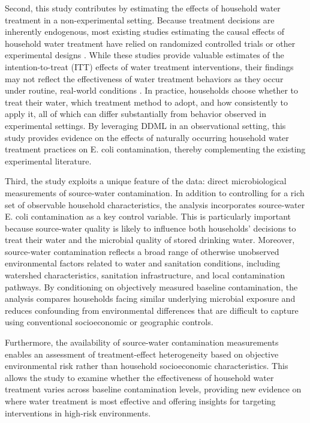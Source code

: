 \documentclass [11pt]{article}
\theoremstyle{plain}
\theoremstyle{definition}
\theoremstyle{remark}
\newcommand{\1}{\bm{1}}
\begin{document}
Second, this study contributes by estimating the effects of household water treatment in a non-experimental setting. Because treatment decisions are inherently endogenous, most existing studies estimating the causal effects of household water treatment have relied on randomized controlled trials or other experimental designs \citep{arnold2007treating,pickering2019wash,luby2018effects}. While these studies provide valuable estimates of the intention-to-treat (ITT) effects of water treatment interventions, their findings may not reflect the effectiveness of water treatment behaviors as they occur under routine, real-world conditions \citep{athey2017state}. In practice, households choose whether to treat their water, which treatment method to adopt, and how consistently to apply it, all of which can differ substantially from behavior observed in experimental settings. By leveraging DDML in an observational setting, this study provides evidence on the effects of naturally occurring household water treatment practices on E. coli contamination, thereby complementing the existing experimental literature.

Third, the study exploits a unique feature of the data: direct microbiological measurements of source-water contamination. In addition to controlling for a rich set of observable household characteristics, the analysis incorporates source-water E. coli contamination as a key control variable. This is particularly important because source-water quality is likely to influence both households’ decisions to treat their water and the microbial quality of stored drinking water. Moreover, source-water contamination reflects a broad range of otherwise unobserved environmental factors related to water and sanitation conditions, including watershed characteristics, sanitation infrastructure, and local contamination pathways. By conditioning on objectively measured baseline contamination, the analysis compares households facing similar underlying microbial exposure and reduces confounding from environmental differences that are difficult to capture using conventional socioeconomic or geographic controls.

Furthermore, the availability of source-water contamination measurements enables an assessment of treatment-effect heterogeneity based on objective environmental risk rather than household socioeconomic characteristics. This allows the study to examine whether the effectiveness of household water treatment varies across baseline contamination levels, providing new evidence on where water treatment is most effective and offering insights for targeting interventions in high-risk environments.
\end{document}
